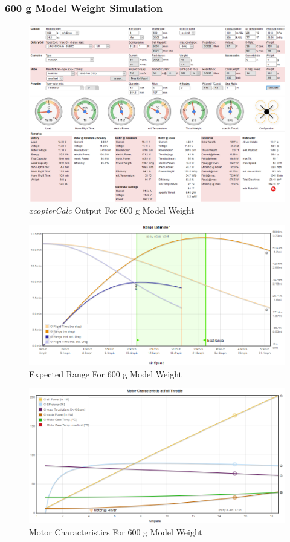 \subsubsection{600 g Model Weight Simulation}

\begin{figure}[H]
\centering
\includegraphics[width=16.5cm]{img/600g_sim.png}
\caption{\textit{xcopterCalc} Output For 600 g Model Weight}
\end{figure} 

\begin{figure}[H]
\centering
\includegraphics[width=16.5cm]{img/600g_range.png}
\caption{Expected Range For 600 g Model Weight}
\end{figure} 

\begin{figure}[H]
\centering
\includegraphics[width=16.5cm]{img/600g_motor.png}
\caption{Motor Characteristics For 600 g Model Weight}
\end{figure} 
\clearpage

